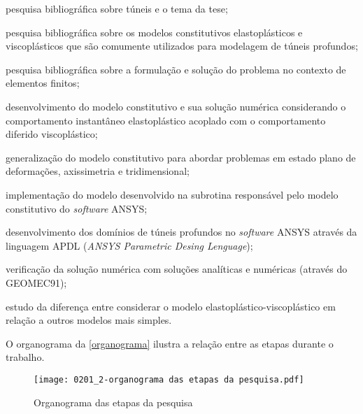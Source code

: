 \begin{alineas}

	\item pesquisa bibliográfica sobre túneis e o tema da tese;
	
	\item pesquisa bibliográfica sobre os modelos constitutivos elastoplásticos e viscoplásticos que são comumente utilizados para modelagem de túneis profundos;
	
	\item pesquisa bibliográfica sobre a formulação e solução do problema no contexto de elementos finitos;
	
	\item desenvolvimento do modelo constitutivo e sua solução numérica considerando o comportamento instantâneo elastoplástico acoplado com o comportamento diferido viscoplástico;
	
	\item generalização do modelo constitutivo para abordar problemas em estado plano de deformações, axissimetria e tridimensional;	
	
	\item implementação do modelo desenvolvido na subrotina responsável pelo modelo constitutivo do \textit{software} ANSYS;	
	
	\item desenvolvimento dos domínios de túneis profundos no \textit{software} ANSYS através da linguagem APDL (\textit{ANSYS Parametric Desing Lenguage});
	
	\item verificação da solução numérica com soluções analíticas e numéricas (através do GEOMEC91);
	
	\item estudo da diferença entre considerar o modelo elastoplástico-viscoplástico em relação a outros modelos mais simples.

\end{alineas}

O organograma da \autoref{organograma} ilustra a relação entre as etapas durante o trabalho.

\begin{figure}[H]
	\begin{center}
		\texttt{[image: 0201\_2-organograma das etapas da pesquisa.pdf]}
	\end{center}
	\caption{\label{organograma}Organograma das etapas da pesquisa}
\end{figure}